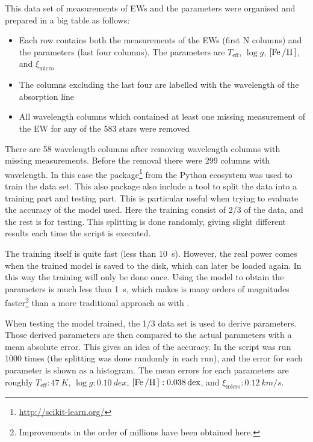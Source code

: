 This data set of measurements of EWs and the parameters were organised and prepared in a big table
as follows:
\begin{itemize}
  \item Each row contains both the measurements of the EWs (first N columns) and the parameters
        (last four columns). The parameters are $T_\mathrm{eff}$, $\log g$, $[\ion{Fe}/\ion{H}]$,
        and $\xi_\mathrm{micro}$
  \item The columns excluding the last four are labelled with the wavelength of the absorption line
  \item All wavelength columns which contained at least one missing measurement of the EW for any
        of the 583 stars were removed
\end{itemize}
There are 58 wavelength columns after removing wavelength columns with missing measurements. Before
the removal there were 299 columns with wavelength. In this case the 
package\footnote{\url{http://scikit-learn.org/}} from the Python ecosystem was used to train the
data set. This also package also include a tool to split the data into a training part and testing
part. This is particular useful when trying to evaluate the accuracy of the model used. Here the
training consist of 2/3 of the data, and the rest is for testing. This splitting is done randomly,
giving slight different results each time the script is executed.

The training itself is quite fast (less than \SI{10}{s}). However, the real power comes when the
trained model is saved to the disk, which can later be loaded again. In this way the training will
only be done once. Using the model to obtain the parameters is much less than \SI{1}{s}, which makes
is many orders of magnitudes faster\footnote{Improvements in the order of millions have been
obtained here.} than a more traditional approach as with .

When testing the model trained, the 1/3 data set is used to derive parameters. Those derived
parameters are then compared to the actual parameters with a mean absolute error. This gives an idea
of the accuracy. In  the script was run 1000 times (the splitting was done randomly in
each run), and the error for each parameter is shown as a histogram. The mean errors for each
parameters are roughly $T_\mathrm{eff}:\SI{47}{K}$, $\log g:\SI{0.10}{dex}$,
$[\ion{Fe}/\ion{H}]:\SI{0.038}{dex}$, and $\xi_\mathrm{micro}:\SI{0.12}{km/s}$.

